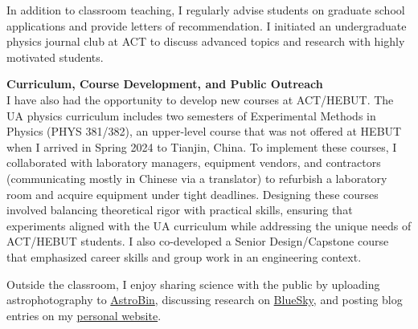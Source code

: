 \documentclass[11pt]{article}
\begin{document}
In addition to classroom teaching, I regularly advise students on graduate school applications and provide letters of recommendation. I initiated an undergraduate physics journal club at ACT to discuss advanced topics and research with highly motivated students.

\vspace{1em}

{\noindent\Large\textbf{Curriculum, Course Development, and Public Outreach}}\\
I have also had the opportunity to develop new courses at ACT/HEBUT. The UA physics curriculum includes two semesters of Experimental Methods in Physics (PHYS 381/382), an upper-level course that was not offered at HEBUT when I arrived in Spring 2024 to Tianjin, China. To implement these courses, I collaborated with laboratory managers, equipment vendors, and contractors (communicating mostly in Chinese via a translator) to refurbish a laboratory room and acquire equipment under tight deadlines. Designing these courses involved balancing theoretical rigor with practical skills, ensuring that experiments aligned with the UA curriculum while addressing the unique needs of ACT/HEBUT students. I also co-developed a Senior Design/Capstone course that emphasized career skills and group work in an engineering context. 

Outside the classroom, I enjoy sharing science with the public by uploading astrophotography to \href{https://www.astrobin.com/users/djinn/}{AstroBin}, discussing research on \href{https://bsky.app/profile/ajsteinmetz.com}{BlueSky}, and posting blog entries on my \href{https://ajsteinmetz.github.io/}{personal website}.
\end{document}
